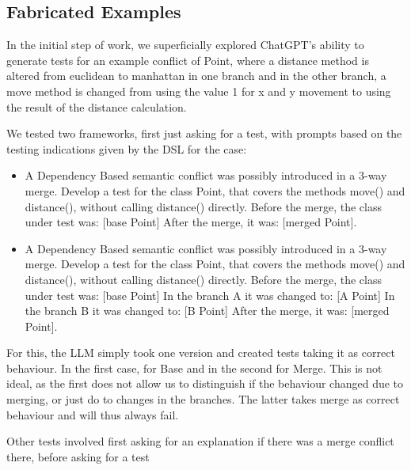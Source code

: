 \subsection{Fabricated Examples}

In the initial step of work, we superficially explored ChatGPT's ability to generate tests for an example conflict of Point, where a distance method is altered from euclidean to manhattan in one branch and in the other branch, a move method is changed from using the value 1 for x and y movement to using the result of the distance calculation.

We tested two frameworks, first just asking for a test, with prompts based on the testing indications given by the DSL for the case:

\begin{itemize}
  \item A Dependency Based semantic conflict was possibly introduced in a 3-way merge. Develop a test for the class Point, that covers the methods move() and distance(), without calling distance() directly.
Before the merge, the class under test was: [base Point]
After the merge, it was: [merged Point].
  \item A Dependency Based semantic conflict was possibly introduced in a 3-way merge. Develop a test for the class Point, that covers the methods move() and distance(), without calling distance() directly.
Before the merge, the class under test was: [base Point]
In the branch A it was changed to: [A Point]
In the branch B it was changed to: [B Point]
After the merge, it was: [merged Point].

\end{itemize}

For this, the LLM simply took one version and created tests taking it as correct behaviour. In the first case, for Base and in the second for Merge. This is not ideal, as the first does not allow us to distinguish if the behaviour changed due to merging, or just do to changes in the branches. The latter takes merge as correct behaviour and will thus always fail.

Other tests involved first asking for an explanation if there was a merge conflict there, before asking for a test

